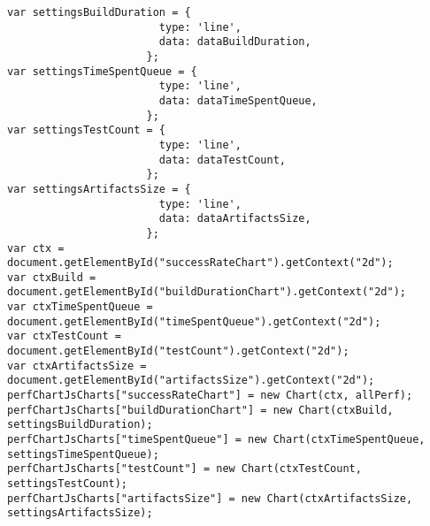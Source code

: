 \begin{lstlisting}
var settingsBuildDuration = {
                        type: 'line',
                        data: dataBuildDuration,
                      };
var settingsTimeSpentQueue = {
                        type: 'line',
                        data: dataTimeSpentQueue,
                      };
var settingsTestCount = {
                        type: 'line',
                        data: dataTestCount,
                      };
var settingsArtifactsSize = {
                        type: 'line',
                        data: dataArtifactsSize,
                      };
var ctx = document.getElementById("successRateChart").getContext("2d");
var ctxBuild = document.getElementById("buildDurationChart").getContext("2d");
var ctxTimeSpentQueue = document.getElementById("timeSpentQueue").getContext("2d");
var ctxTestCount = document.getElementById("testCount").getContext("2d");
var ctxArtifactsSize = document.getElementById("artifactsSize").getContext("2d");
perfChartJsCharts["successRateChart"] = new Chart(ctx, allPerf);
perfChartJsCharts["buildDurationChart"] = new Chart(ctxBuild, settingsBuildDuration);
perfChartJsCharts["timeSpentQueue"] = new Chart(ctxTimeSpentQueue, settingsTimeSpentQueue);
perfChartJsCharts["testCount"] = new Chart(ctxTestCount, settingsTestCount);
perfChartJsCharts["artifactsSize"] = new Chart(ctxArtifactsSize, settingsArtifactsSize);




\end{lstlisting}

